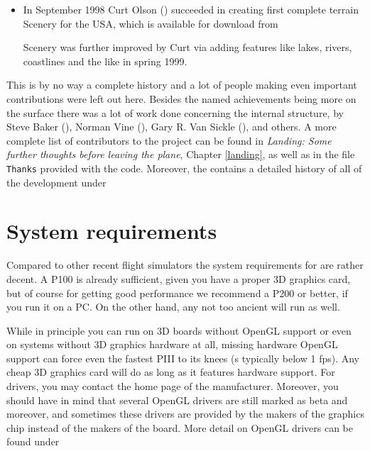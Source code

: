 \begin{itemize}
\item In September 1998 Curt Olson
() succeeded in creating first complete terrain Scenery for the
USA, which is available for download from


Scenery was further improved by Curt via adding features like lakes, rivers, coastlines
and the like in spring 1999.

\end{itemize}

\longpage

This is by no way a complete history and a lot of people making even important
contributions were left out here. Besides the named achievements being more on the
surface there was a lot of work done concerning the internal structure, by Steve
Baker (), Norman
Vine (), Gary R. Van Sickle (), and others. A more complete list of
contributors to the project can be found in \textit{Landing: Some further thoughts before
leaving the plane}, Chapter \ref{landing}, as well as in the file \texttt{Thanks}
provided with the code. Moreover, the  contains a detailed
history of all of the development under


\section{System requirements}
Compared to other recent flight simulators the system requirements
for \FlightGear are rather decent. A P100 is already sufficient,
given you have a proper 3D graphics card, but of course for
getting good performance we recommend a P200 or better, if you run
it on a PC. On the other hand, any not too ancient 
 will run \FlightGear as well.

While in principle you can run \FlightGear on 3D boards without OpenGL support or even on
systems without 3D graphics hardware at all, missing hardware OpenGL support can force
even the fastest PIII to its knees (s typically below 1 fps). Any cheap
3D graphics card will do as long as it features hardware  support. For
 drivers, you may contact the home page of the manufacturer.
Moreover, you should have in mind that several OpenGL drivers are
still marked as beta and moreover, and sometimes these drivers are provided by the makers
of the graphics chip instead of the makers of the board. More detail on OpenGL drivers
can be found under

